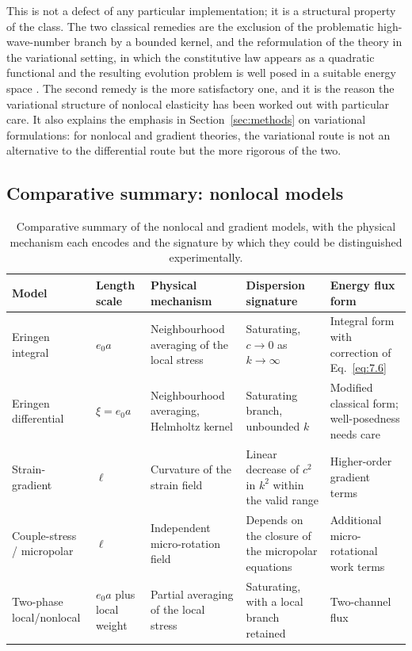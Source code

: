 This is not a defect of any particular implementation; it is a structural property of the class. The two classical remedies are the exclusion of the problematic high-wave-number branch by a bounded kernel, and the reformulation of the theory in the variational setting, in which the constitutive law appears as a quadratic functional and the resulting evolution problem is well posed in a suitable energy space \cite{Polizzotto2001}. The second remedy is the more satisfactory one, and it is the reason the variational structure of nonlocal elasticity has been worked out with particular care. It also explains the emphasis in Section~\ref{sec:methods} on variational formulations: for nonlocal and gradient theories, the variational route is not an alternative to the differential route but the more rigorous of the two.

\subsection{Comparative summary: nonlocal models}

\begin{table}[htbp]
\centering
\small
\caption{Comparative summary of the nonlocal and gradient models, with the physical mechanism each encodes and the signature by which they could be distinguished experimentally.}
\label{tab:nonlocal_comparison}
\begin{tabularx}{\textwidth}{@{}lXXXX@{}}
\toprule
\textbf{Model} & \textbf{Length scale} & \textbf{Physical mechanism} & \textbf{Dispersion signature} & \textbf{Energy flux form} \\
\midrule
Eringen integral & $e_0 a$ & Neighbourhood averaging of the local stress & Saturating, $c \to 0$ as $k \to \infty$ & Integral form with correction of Eq.~\eqref{eq:7.6} \\
Eringen differential & $\xi = e_0 a$ & Neighbourhood averaging, Helmholtz kernel & Saturating branch, unbounded $k$ & Modified classical form; well-posedness needs care \\
Strain-gradient & $\ell$ & Curvature of the strain field & Linear decrease of $c^2$ in $k^2$ within the valid range & Higher-order gradient terms \\
Couple-stress / micropolar & $\ell$ & Independent micro-rotation field & Depends on the closure of the micropolar equations & Additional micro-rotational work terms \\
Two-phase local/nonlocal & $e_0 a$ plus local weight & Partial averaging of the local stress & Saturating, with a local branch retained & Two-channel flux \\
\bottomrule
\end{tabularx}
\end{table}

